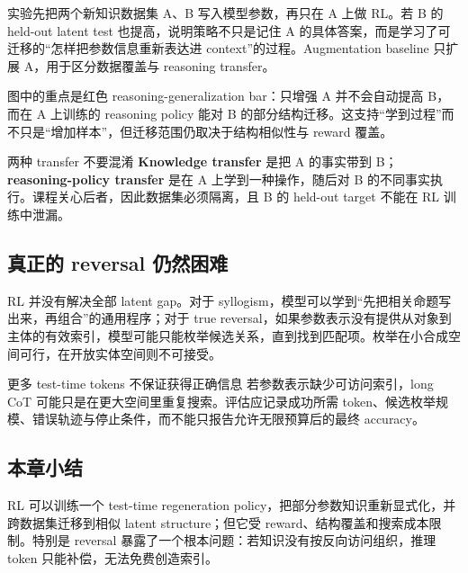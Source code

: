 实验先把两个新知识数据集 A、B 写入模型参数，再只在 A 上做 RL。若 B 的 held-out latent test 也提高，说明策略不只是记住 A 的具体答案，而是学习了可迁移的“怎样把参数信息重新表达进 context”的过程。Augmentation baseline 只扩展 A，用于区分数据覆盖与 reasoning transfer。



图中的重点是红色 reasoning-generalization bar：只增强 A 并不会自动提高 B，而在 A 上训练的 reasoning policy 能对 B 的部分结构迁移。这支持“学到过程”而不只是“增加样本”，但迁移范围仍取决于结构相似性与 reward 覆盖。

\begin{knowledgebox}{两种 transfer 不要混淆}
\textbf{Knowledge transfer} 是把 A 的事实带到 B；\textbf{reasoning-policy transfer} 是在 A 上学到一种操作，随后对 B 的不同事实执行。课程关心后者，因此数据集必须隔离，且 B 的 held-out target 不能在 RL 训练中泄漏。
\end{knowledgebox}

\subsection{真正的 reversal 仍然困难}

RL 并没有解决全部 latent gap。对于 syllogism，模型可以学到“先把相关命题写出来，再组合”的通用程序；对于 true reversal，如果参数表示没有提供从对象到主体的有效索引，模型可能只能枚举候选关系，直到找到匹配项。枚举在小合成空间可行，在开放实体空间则不可接受。




\begin{warningbox}{更多 test-time tokens 不保证获得正确信息}
若参数表示缺少可访问索引，long CoT 可能只是在更大空间里重复搜索。评估应记录成功所需 token、候选枚举规模、错误轨迹与停止条件，而不能只报告允许无限预算后的最终 accuracy。
\end{warningbox}

\subsection{本章小结}

RL 可以训练一个 test-time regeneration policy，把部分参数知识重新显式化，并跨数据集迁移到相似 latent structure；但它受 reward、结构覆盖和搜索成本限制。特别是 reversal 暴露了一个根本问题：若知识没有按反向访问组织，推理 token 只能补偿，无法免费创造索引。

